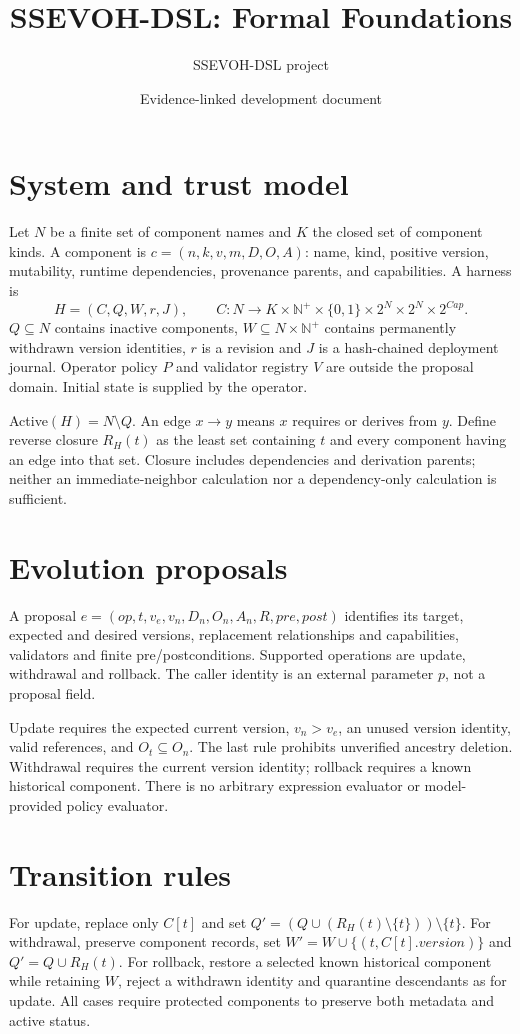 \documentclass[11pt]{article}
\title{SSEVOH-DSL: Formal Foundations}
\author{SSEVOH-DSL project}
\date{Evidence-linked development document}
\begin{document}
\maketitle

\section{System and trust model}
Let $N$ be a finite set of component names and $K$ the closed set of component kinds. A component is $c=(n,k,v,m,D,O,A)$: name, kind, positive version, mutability, runtime dependencies, provenance parents, and capabilities. A harness is
\[H=(C,Q,W,r,J),\qquad C:N\to K\times\mathbb N^+\times\{0,1\}\times2^N\times2^N\times2^{Cap}.\]
$Q\subseteq N$ contains inactive components, $W\subseteq N\times\mathbb N^+$ contains permanently withdrawn version identities, $r$ is a revision and $J$ is a hash-chained deployment journal. Operator policy $P$ and validator registry $V$ are outside the proposal domain. Initial state is supplied by the operator.

Active$(H)=N\setminus Q$. An edge $x\to y$ means $x$ requires or derives from $y$. Define reverse closure $R_H(t)$ as the least set containing $t$ and every component having an edge into that set. Closure includes dependencies and derivation parents; neither an immediate-neighbor calculation nor a dependency-only calculation is sufficient.

\section{Evolution proposals}
A proposal $e=(op,t,v_e,v_n,D_n,O_n,A_n,R,pre,post)$ identifies its target, expected and desired versions, replacement relationships and capabilities, validators and finite pre/postconditions. Supported operations are update, withdrawal and rollback. The caller identity is an external parameter $p$, not a proposal field.

Update requires the expected current version, $v_n>v_e$, an unused version identity, valid references, and $O_t\subseteq O_n$. The last rule prohibits unverified ancestry deletion. Withdrawal requires the current version identity; rollback requires a known historical component. There is no arbitrary expression evaluator or model-provided policy evaluator.

\section{Transition rules}
For update, replace only $C[t]$ and set $Q'=(Q\cup(R_H(t)\setminus\{t\}))\setminus\{t\}$. For withdrawal, preserve component records, set $W'=W\cup\{(t,C[t].version)\}$ and $Q'=Q\cup R_H(t)$. For rollback, restore a selected known historical component while retaining $W$, reject a withdrawn identity and quarantine descendants as for update. All cases require protected components to preserve both metadata and active status.
\end{document}
